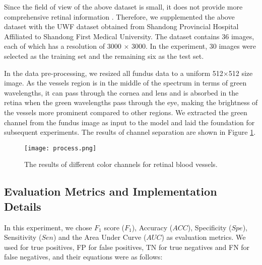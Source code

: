 \documentclass[a4paper,fleqn]{cas-dc}
\begin{document}
Since the field of view of the above dataset is small, it does not provide more comprehensive retinal information \cite{wu2019comparing}. Therefore, we supplemented the above dataset with the UWF dataset obtained from Shandong Provincial Hospital Affiliated to Shandong First Medical University. The dataset contains 36 images, each of which has a resolution of 3000 $\times$ 3000. In the experiment, 30 images were selected as the training set and the remaining six as the test set. 

In the data pre-processing, we resized all fundus data to a uniform 512$\times$512 size image. As the vessels region is in the middle of the spectrum in terms of green wavelengths, it can pass through the cornea and lens and is absorbed in the retina when the green wavelengths pass through the eye, making the brightness of the vessels more prominent compared to other regions. We extracted the green channel from the fundus image as input to the model and laid the foundation for subsequent experiments. The results of channel separation are shown in Figure \ref{process}.

\begin{figure}[ht!]
	\centering\texttt{[image: process.png]}
	\caption{The results of different color channels for retinal blood vessels.}
	\label{process}
\end{figure}


\subsection{Evaluation Metrics and Implementation Details}


In this experiment, we chose $F_{1}$ score ($F_{1}$), Accuracy ($ACC$), Specificity ($Spe$), Sensitivity ($Sen$) and the Area Under Curve ($AUC$) as evaluation metrics. We used   for true positives, FP for false positives, TN for true negatives and FN for false negatives, and their equations were as follows:
\end{document}
